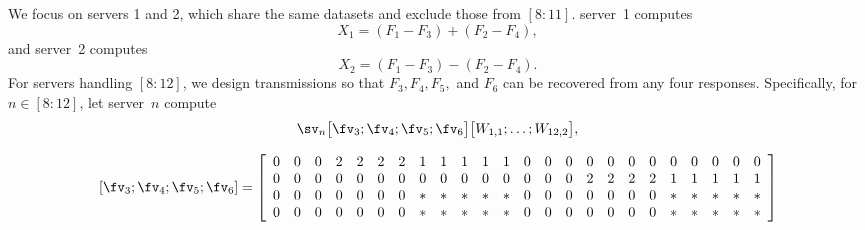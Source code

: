 \documentclass[conference,letterpaper]{IEEEtran}
\begin{document}
\begin{example}

We focus on servers 1 and 2, which share the same datasets and exclude those from $[8{:}11]$. 
server~1 computes 
\[
X_1 = (F_1 - F_3) + (F_2 - F_4),
\]
and server~2 computes
\[
X_2 = (F_1 - F_3) - (F_2 - F_4).
\]
For servers handling $[8{:}12]$, we design transmissions so that $F_3, F_4, F_5,$ and $F_6$ 
can be recovered from any four responses. Specifically, for $n \in [8{:}12]$, let 
server~$n$ compute
\[
\sv_n \bigl[ \fv_3 ; \fv_4 ; \fv_5 ; \fv_6 \bigr] 
\bigl[ W_{1,1}; \ldots; W_{12,2} \bigr],
\]


\iffalse
\begin{figure*}
\begin{equation} \label{eq:scheme 3 transmission of second class}
\begin{aligned}
\left[ {\fv}_3 ;  {\fv}_4 ;  {\fv}_5 ;  {\fv}_6 \right] = 
 \left[
\begin{array}{cccccccccccccccccccccccc}
 0 & 0 & 0 &  2 & 2 & 2 & 2 &  1 & 1 & 1 & 1 & 1 & 0 & 0 & 0 & 0 & 0 & 0 & 0 & 0 & 0 & 0 & 0 & 0 \\
 0 & 0 & 0 & 0 & 0 & 0 & 0 & 0 & 0 & 0 & 0 & 0 & 0 & 0 & 0 & 2 & 2 & 2 & 2 & 1 & 1 & 1 & 1 & 1 \\
 0 & 0 & 0 & 0 & 0 & 0 & 0 & * & * & * & * & * & 0 & 0 & 0 & 0 & 0 & 0 & 0 & * & * & * & * & * \\
 0 & 0 & 0 & 0 & 0 & 0 & 0 & * & * & * & * & * & 0 & 0 & 0 & 0 & 0 & 0 & 0 & * & * & * & * & *
\end{array}
 \right]
\end{aligned}
\end{equation}
\end{figure*}


\end{example}
\end{document}
